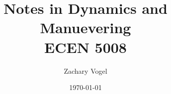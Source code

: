 \documentclass{article}
\author{Zachary Vogel}
\title{Notes in Dynamics and Manuevering\\ ECEN 5008}
\date{\today}
\begin{document}
\maketitle
\section{}
\end{document}
